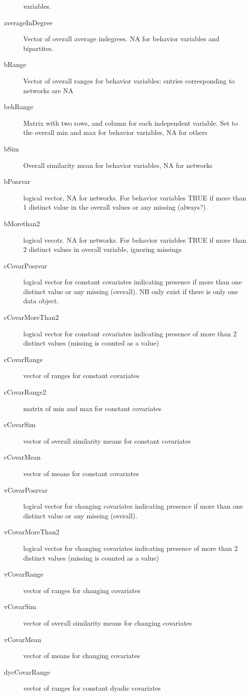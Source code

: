 \documentclass[12pt,a4paper]{article}
\renewcommand{\=}{\,=\,}
\newcommand{\+}{\,+\,}
\begin{document}
\begin{description}
  variables.
\item[averageInDegree] Vector of overall average indegrees. NA for behavior
  variables and bipartites.
\item[bRange] Vector of overall ranges for behavior variables: entries
  corresponding to networks are NA
\item[behRange] Matrix with two rows, and column for each independent
  variable. Set to the overall min and max for behavior variables, NA for others
\item[bSim] Overall similarity mean for behavior variables, NA for networks
\item[bPoszvar] logical vector, NA for networks. For behavior variables TRUE if
  more than 1 distinct value in the overall values or any missing (always?)
\item[bMorethan2] logical vecotr. NA for networks. For behavior variables
  TRUE if more than 2 distinct values in overall variable, ignoring missings
\item[cCovarPoszvar] logical vector for constant covariates indicating presence
  if more than one distinct value or any missing (overall). NB only exist if
  there is only one data object.
\item[cCovarMoreThan2] logical vector for constant covariates indicating
  presence of more than 2 distinct values (missing is counted as a value)
\item[cCovarRange] vector of ranges for constant covariates
\item[cCovarRange2] matrix of min and max for constant covariates
\item[cCovarSim] vector of overall similarity means for constant covariates
\item[cCovarMean] vector of means for constant covariates
\item[vCovarPoszvar] logical vector for changing covariates indicating presence
  if more than one distinct value or any missing (overall).
\item[vCovarMoreThan2] logical vector for changing covariates indicating
  presence of more than 2 distinct values (missing is counted as a value)
\item[vCovarRange] vector of ranges for changing covariates
\item[vCovarSim] vector of overall similarity means for changing covariates
\item[vCovarMean] vector of means for changing covariates
\item[dycCovarRange] vector of ranges for constant dyadic covariates

\end{description}
\end{document}
